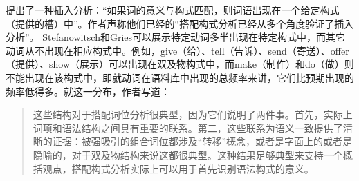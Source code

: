 \begin{exe}
\begin{xlist}[iv.]
\begin{exe}
\begin{xlist}[iv.]
\mbox{}\citet[\S~5]{SG2009a}提出了一种插入分析：“如果词的意义与构式匹配，则词语出现在一个给定构式（提供的槽）中”。作者声称他们已经的“搭配构式分析已经从多个角度验证了插入分析”。 Stefanowitsch和Gries可以展示特定动词多半出现在特定构式中，而其它动词从不出现在相应构式中。例如，give（给）、tell（告诉）、send（寄送）、offer（提供）、show（展示）可以出现在双及物构式中，而make（制作）和do（做）则不能出现在该构式中，即就动词在语料库中出现的总频率来讲，它们比预期出现的频率低得多。就这一分布，作者写道：
\begin{quote}
这些结构对于搭配词位分析很典型，因为它们说明了两件事。首先，实际上词项和语法结构之间具有重要的联系。第二，这些联系为语义一致提供了清晰的证据：被强吸引的组合词位都涉及“转移”概念，或者是字面上的或者是隐喻的，对于双及物结构来说这都很典型。这种结果足够典型来支持一个概括观点，搭配构式分析实际上可以用于首先识别语法构式的意义。\citep[]{SG2009a}
\end{quote}


\end{xlist}
\end{exe}
\end{xlist}
\end{exe}
